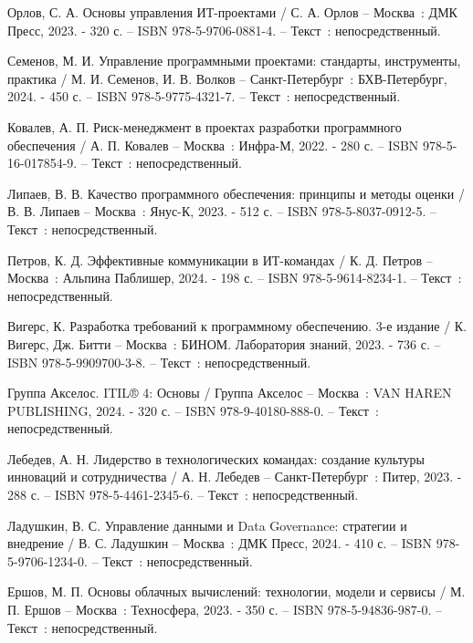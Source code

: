 
\begin{thebibliography}{99}
	
	
	 Орлов, С. А. Основы управления ИТ-проектами / С. А. Орлов – Москва~: ДМК Пресс, 2023. - 320 с. – ISBN 978-5-9706-0881-4. – Текст~: непосредственный.
	
	 Семенов, М. И. Управление программными проектами: стандарты, инструменты, практика / М. И. Семенов, И. В. Волков – Санкт-Петербург~: БХВ-Петербург, 2024. - 450 с. – ISBN 978-5-9775-4321-7. – Текст~: непосредственный.
	
	 Ковалев, А. П. Риск-менеджмент в проектах разработки программного обеспечения / А. П. Ковалев – Москва~: Инфра-М, 2022. - 280 с. – ISBN 978-5-16-017854-9. – Текст~: непосредственный.
	
	 Липаев, В. В. Качество программного обеспечения: принципы и методы оценки / В. В. Липаев – Москва~: Янус-К, 2023. - 512 с. – ISBN 978-5-8037-0912-5. – Текст~: непосредственный.
	
	 Петров, К. Д. Эффективные коммуникации в ИТ-командах / К. Д. Петров – Москва~: Альпина Паблишер, 2024. - 198 с. – ISBN 978-5-9614-8234-1. – Текст~: непосредственный.
	
	 Вигерс, К. Разработка требований к программному обеспечению. 3-е издание / К. Вигерс, Дж. Битти – Москва~: БИНОМ. Лаборатория знаний, 2023. - 736 с. – ISBN 978-5-9909700-3-8. – Текст~: непосредственный.
	
	 Группа Акселос. ITIL® 4: Основы / Группа Акселос – Москва~: VAN HAREN PUBLISHING, 2024. - 320 с. – ISBN 978-9-40180-888-0. – Текст~: непосредственный.
	
	 Лебедев, А. Н. Лидерство в технологических командах: создание культуры инноваций и сотрудничества / А. Н. Лебедев – Санкт-Петербург~: Питер, 2023. - 288 с. – ISBN 978-5-4461-2345-6. – Текст~: непосредственный.
	
	 Ладушкин, В. С. Управление данными и Data Governance: стратегии и внедрение / В. С. Ладушкин – Москва~: ДМК Пресс, 2024. - 410 с. – ISBN 978-5-9706-1234-0. – Текст~: непосредственный.
	
	 Ершов, М. П. Основы облачных вычислений: технологии, модели и сервисы / М. П. Ершов – Москва~: Техносфера, 2023. - 350 с. – ISBN 978-5-94836-987-0. – Текст~: непосредственный.
	

\end{thebibliography}
